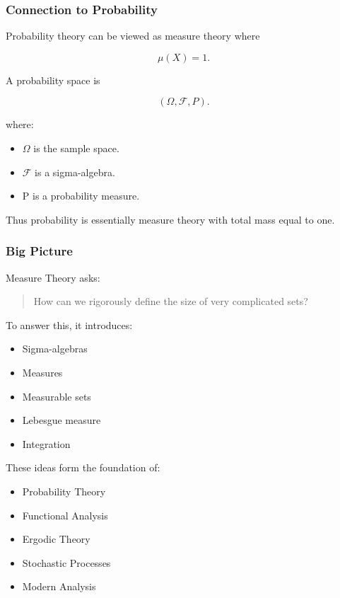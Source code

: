 \documentclass[11pt]{article}
\begin{document}
\subsubsection{Connection to Probability}
\label{sec:org925b138}

Probability theory can be viewed as measure theory where

\[
\mu(X)=1.
\]

A probability space is

\[
(\Omega,\mathcal F,P).
\]

where:

\begin{itemize}
\item \(\Omega\) is the sample space.
\item \(\mathcal F\) is a sigma-algebra.
\item P is a probability measure.
\end{itemize}

Thus probability is essentially measure theory with total mass equal to one.
\subsubsection{Big Picture}
\label{sec:orga73799d}

Measure Theory asks:

\begin{quote}
How can we rigorously define the size of very complicated sets?
\end{quote}

To answer this, it introduces:

\begin{itemize}
\item Sigma-algebras
\item Measures
\item Measurable sets
\item Lebesgue measure
\item Integration
\end{itemize}

These ideas form the foundation of:

\begin{itemize}
\item Probability Theory
\item Functional Analysis
\item Ergodic Theory
\item Stochastic Processes
\item Modern Analysis
\end{itemize}
\end{document}
